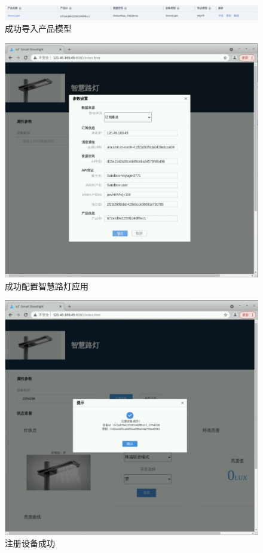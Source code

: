 \begin{figure}[!htbp]
\centering
\includegraphics[width=\textwidth]{figures/序列 01.00_12_42_51.Still008.png}
\caption{成功导入产品模型}\label{成功导入产品模型}
\end{figure}

\begin{figure}[!htbp]
\centering
\includegraphics[width=\textwidth]{figures/序列 01.00_15_17_06.Still009.png}
\caption{成功配置智慧路灯应用}\label{成功配置智慧路灯应用}
\end{figure}

\begin{figure}[!htbp]
\centering
\includegraphics[width=\textwidth]{figures/序列 01.00_15_33_13.Still010.png}
\caption{注册设备成功}\label{注册设备成功}
\end{figure}

